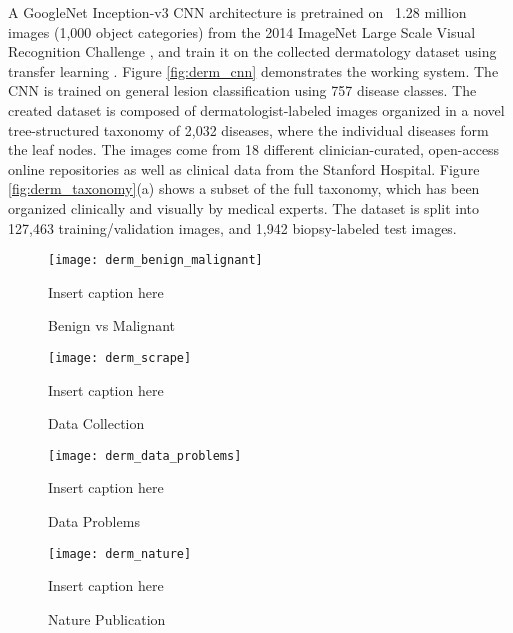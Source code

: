A GoogleNet Inception-v3 CNN architecture \cite{szegedy2016rethinking} is pretrained on ~1.28 million images (1,000 object categories) from the 2014 ImageNet Large Scale Visual Recognition Challenge \cite{russakovsky2015imagenet}, and train it on the collected dermatology dataset using transfer learning \cite{pan2009survey}. Figure \ref{fig:derm_cnn} demonstrates the working system. The CNN is trained on general lesion classification using 757 disease classes. The created dataset is composed of dermatologist-labeled images organized in a novel tree-structured taxonomy of 2,032 diseases, where the individual diseases form the leaf nodes. The images come from 18 different clinician-curated, open-access online repositories as well as clinical data from the Stanford Hospital. Figure \ref{fig:derm_taxonomy}(a) shows a subset of the full taxonomy, which has been organized clinically and visually by medical experts. The dataset is split into 127,463 training/validation images, and 1,942 biopsy-labeled test images.

\begin{figure}
\texttt{[image: derm\_benign\_malignant]}
\caption{Benign vs Malignant}
\vspace{12px}
Insert caption here
\label{fig:derm_benign_malignant}
\end{figure}

\begin{figure}
\texttt{[image: derm\_scrape]}
\caption{Data Collection}
\vspace{12px}
Insert caption here
\label{fig:derm_scrape}
\end{figure}

\begin{figure}
\texttt{[image: derm\_data\_problems]}
\caption{Data Problems}
\vspace{12px}
Insert caption here
\label{fig:derm_data_problems}
\end{figure}

\begin{figure}
\texttt{[image: derm\_nature]}
\caption{Nature Publication}
\vspace{12px}
Insert caption here
\label{fig:derm_nature}
\end{figure}

